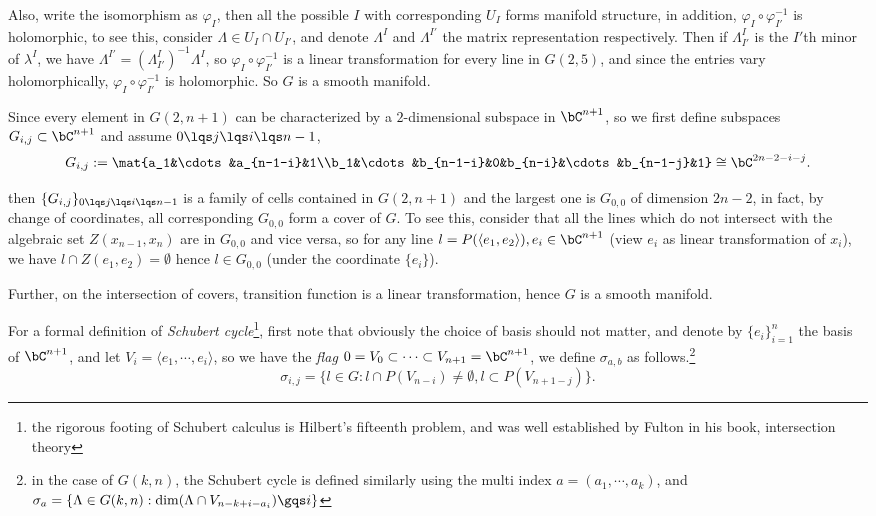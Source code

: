 \documentclass[a4paper, twoside]{article}
\begin{document}
Also, write the isomorphism as $\varphi_I$, then all the possible $I$ with corresponding $U_I$ forms manifold structure, in addition, $\varphi_I\circ\varphi_{I'}^{-1}$ is holomorphic, to see this, consider $\Lambda\in U_I\cap U_{I'}$, and denote $\Lambda^I$ and $\Lambda^{I'}$ the matrix representation respectively. Then if $\Lambda_{I'}^I$ is the $I'$th minor of $\lambda^{I}$, we have $\Lambda^{I'}=(\Lambda_{I'}^I)^{-1}\Lambda^I$, so $\varphi_I\circ\varphi_{I'}^{-1}$ is a linear transformation for every line in $G(2,5)$, and since the entries vary holomorphically, $\varphi_I\circ\varphi_{I'}^{-1}$ is holomorphic. So $G$ is a smooth manifold.

Since every element in $G(2,n+1)$ can be characterized by a $2$-dimensional subspace in $\bC^{n+1}$, so we first define subspaces $G_{i,j}\subset\bC^{n+1}$ and assume $0\lqs j\lqs i\lqs n-1$,
$$
G_{i,j}:=\mat{a_1&\cdots&a_{n-1-i}&1\\b_1&\cdots&b_{n-1-i}&0&b_{n-i}&\cdots&b_{n-1-j}&1}\cong\bC^{2n-2-i-j}.
$$

then $\{G_{i,j}\}_{0\lqs j\lqs i\lqs n-1}$ is a family of cells contained in $G(2,n+1)$ and the largest one is $G_{0,0}$ of dimension $2n-2$, in fact, by change of coordinates, all corresponding $G_{0,0}$ form a cover of $G$. To see this, consider that all the lines which do not intersect with the algebraic set $Z(x_{n-1}, x_n)$ are in $G_{0,0}$ and vice versa, so for any line $l=P(\langle e_1,e_2\rangle), e_i\in\bC^{n+1}$ (view $e_i$ as linear transformation of $x_i$), we have $l\cap Z(e_1, e_2)=\emptyset$ hence $l\in G_{0,0}$ (under the coordinate $\{e_i\}$).

Further, on the intersection of covers, transition function is a linear transformation, hence $G$ is a smooth manifold.

For a formal definition of \emph{Schubert cycle}\footnote{the rigorous footing of Schubert calculus is Hilbert's fifteenth problem, and was well established by Fulton in his book, intersection theory}, first note that obviously the choice of basis should not matter, and denote by $\{e_i\}_{i=1}^n$ the basis of $\bC^{n+1}$, and let $V_i=\langle e_1,\cdots, e_i\rangle$, so we have the \emph{flag} $0=V_0\subset\cdots\subset V_{n+1}=\bC^{n+1}$, we define $\sigma_{a,b}$ as follows.\footnote{in the case of $G(k,n)$, the Schubert cycle is defined similarly using the multi index $a=(a_1,\cdots,a_k)$, and $\sigma_{a}=\{\Lambda\in G(k,n):\dim(\Lambda\cap V_{n-k+i-a_i})\gqs i\}$}
$$
\sigma_{i,j}=\{l\in G: l\cap P(V_{n-i})\neq\emptyset, l\subset P(V_{n+1-j}) \}.
$$
\end{document}
